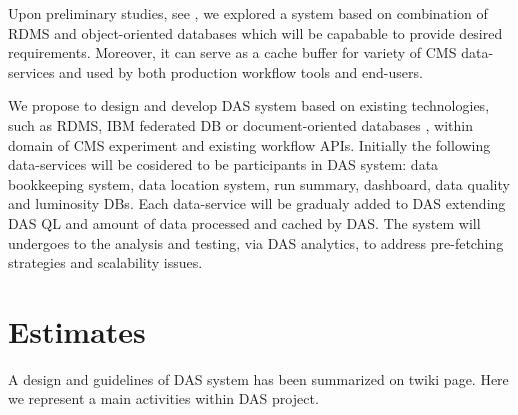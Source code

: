 \documentclass[a4paper]{jpconf}
\begin{document}

Upon preliminary studies, see \cite{DAS}, we explored a
system based on combination of RDMS and object-oriented databases
which will be capabable to provide desired requirements. Moreover,
it can serve as a cache buffer for variety of CMS data-services
and used by both production workflow tools and end-users.

We propose to design and develop DAS system based on existing
technologies, such as RDMS, IBM federated DB \cite{FedDB} or 
document-oriented databases \cite{CouchDB, MongoDB}, within
domain of CMS experiment and existing workflow APIs. Initially
the following data-services will be cosidered to be participants in
DAS system: data bookkeeping system, data location system, run summary, 
dashboard, data quality and luminosity DBs.
Each data-service will be gradualy added to DAS extending DAS
QL and amount of data processed and cached by DAS. The system will
undergoes to the analysis and testing, via DAS analytics, to address pre-fetching
strategies and scalability issues.

\section{Estimates}
A design and guidelines of DAS system has been summarized on
\cite{DAS} twiki page. Here we represent a main activities within
DAS project.
\end{document}
